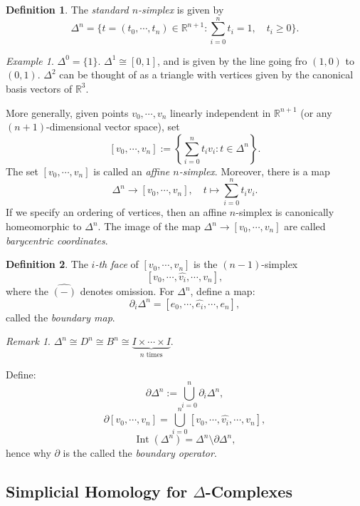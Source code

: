 \documentclass[a4paper]{report}
\theoremstyle{definition}
\newtheorem{definition}{Definition}
\theoremstyle{remark}
\newtheorem{remark}{Remark}
\theoremstyle{proposition}
\theoremstyle{conjecture}
\theoremstyle{lemma}
\theoremstyle{corollary}
\theoremstyle{exercise}
\newtheorem{example}{Example}
\newcommand{\on}{\operatorname}
\begin{document}
\begin{definition}
    The \emph{standard $n$-simplex} is given by 
    $$\Delta^n = \lbrace t = (t_0,\cdots,t_n) \in \mathbb{R}^{n+1} : \sum_{i=0}^n t_i = 1, \quad t_i \geq 0\rbrace.$$
\end{definition}

\begin{example}
    $\Delta^0 = \lbrace 1\rbrace$. $\Delta^1 \cong [0,1]$, and is given by the line going fro $(1,0)$ to $(0,1)$. 
    $\Delta^2$ can be thought of as a triangle 
    with vertices given by the canonical basis vectors of $\mathbb{R}^3$.
\end{example}

More generally, given points $v_0,\cdots,v_n$ linearly independent in $\mathbb{R}^{n+1}$ 
(or any $(n+1)$-dimensional vector space), set 
$$[v_0, \cdots, v_n] := \left\lbrace \sum_{i=0}^n t_iv_i : t \in \Delta^n \right\rbrace.$$
The set $[v_0,\cdots,v_n]$ is called an \emph{affine $n$-simplex}.
Moreover, there is a map 
$$\Delta^n \longrightarrow [v_0,\cdots, v_n],\quad t\longmapsto \sum_{i=0}^n t_iv_i.$$
If we specify an ordering of vertices, then an affine $n$-simplex is canonically homeomorphic to 
$\Delta^n$. The image of the map $\Delta^n \to [v_0,\cdots,v_n]$ are called \emph{barycentric coordinates}.

\begin{definition}
    The \emph{$i$-th face} of $[v_0,\cdots,v_n]$ is the $(n-1)$-simplex 
    $$[v_0,\cdots, \widehat{v_i},\cdots, v_n],$$ where the 
    $\widehat{(-)}$ denotes omission.
    For $\Delta^n$, define a map:
    $$\partial_i \Delta^n = [e_0,\cdots, \widehat{e_i},\cdots,e_n],$$
    called the \emph{boundary map}.
\end{definition}

\begin{remark}
    $\Delta^n \cong D^n \cong B^n \cong \underbrace{I \times \cdots \times I}_{\text{$n$ times}}$.
\end{remark}

Define:
$$\partial \Delta^n := \bigcup_{i=0}^n \partial_i \Delta^n,$$ 
$$\partial [v_0,\cdots, v_n] = \bigcup_{i=0}^n [v_0,\cdots,\widehat{v_i},\cdots, v_n],$$
$$\on{Int}(\Delta^n)  = \Delta^n \setminus \partial \Delta^n,$$ 
hence why $\partial$ is the called the \emph{boundary operator}.

\subsection{Simplicial Homology for $\Delta$-Complexes}
\end{document}
